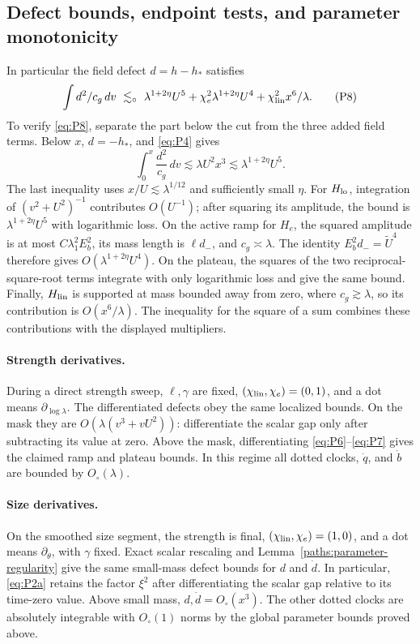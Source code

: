 \subsection{Defect bounds, endpoint tests, and parameter monotonicity}

In particular the field defect \(d=h-h_*\) satisfies
\[
 \int d^2/c_g\,dv\ \lesssim_\circ\
   \lambda^{1+2\eta}U^5+\chi_e^2\lambda^{1+2\eta}U^4+\chi_{\rm lin}^2 x^6/\lambda.       \tag{P8}\label{eq:P8}
\]
To verify \eqref{eq:P8}, separate the part below the cut from the
three added field terms. Below \(x\), \(d=-h_*\), and
\eqref{eq:P4} gives
\[
 \int_0^x\frac{d^2}{c_g}\,dv
 \lesssim\lambda U^2x^3
 \lesssim\lambda^{1+2\eta}U^5.
\]
The last inequality uses \(x/U\lesssim\lambda^{1/12}\) and sufficiently
small \(\eta\). For \(H_{\rm lo}\), integration of
\((v^2+U^2)^{-1}\) contributes \(O(U^{-1})\); after squaring its
amplitude, the bound is \(\lambda^{1+2\eta}U^5\) with logarithmic
loss. On the active ramp for \(H_e\), the squared amplitude is at
most \(C\lambda_1^2E_b^2\), its mass length is \(\ell d_-\), and
\(c_g\asymp\lambda\). The identity
\(E_b^2d_-=\widetilde U^4\) therefore gives
\(O(\lambda^{1+2\eta}U^4)\). On the plateau, the squares of the two
reciprocal-square-root terms integrate with only logarithmic loss and
give the same bound. Finally, \(H_{\rm lin}\) is supported at mass
bounded away from zero, where \(c_g\gtrsim\lambda\), so its contribution
is \(O(x^6/\lambda)\). The inequality for the square of a sum combines
these contributions with the displayed multipliers.

\paragraph{Strength derivatives.}
During a direct strength sweep, \(\ell,\gamma\) are fixed,
\((\chi_{\rm lin},\chi_e)=(0,1)\), and a dot means
\(\partial_{\log\lambda}\). The differentiated defects obey the
same localized bounds. On the mask they are
\(O(\lambda(v^3+vU^2))\): differentiate the scalar gap only after
subtracting its value at zero. Above the mask, differentiating
\eqref{eq:P6}--\eqref{eq:P7} gives the claimed ramp and plateau bounds.
In this regime all dotted clocks, \(\dot q\), and \(\dot b\) are
bounded by \(O_\circ(\lambda)\).

\paragraph{Size derivatives.}
On the smoothed size segment, the strength is final,
\((\chi_{\rm lin},\chi_e)=(1,0)\), and a dot means
\(\partial_\theta\), with \(\gamma\) fixed. Exact scalar rescaling
and Lemma~\ref{paths:parameter-regularity} give the same small-mass
defect bounds for \(d\) and \(\dot d\). In particular,
\eqref{eq:P2a} retains the factor \(\xi^2\) after differentiating
the scalar gap relative to its time-zero value. Above small
mass, \(d,\dot d=O_\circ(x^3)\). The other dotted clocks are
absolutely integrable with \(O_\circ(1)\) norms by the global
parameter bounds proved above.


